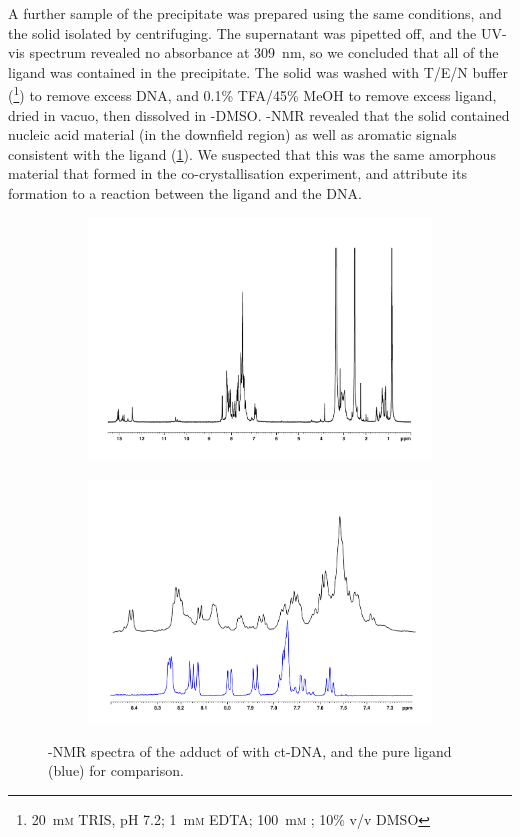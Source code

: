 \begin{refsection}
A further sample of the precipitate was prepared using the same conditions, and the solid isolated by centrifuging.
The supernatant was pipetted off, and the UV-vis spectrum revealed no absorbance at 309~nm, so we concluded that all of the ligand was contained in the precipitate.
The solid was washed with T/E/N buffer (\footnote{20~m\textsc{m} TRIS, pH 7.2; 1~m\textsc{m} EDTA; 100~m\textsc{m} ; 10\% v/v DMSO}) to remove excess DNA, and 0.1\% TFA/45\% MeOH to remove excess ligand, dried in vacuo, then dissolved in -DMSO.\@
{}-NMR revealed that the solid contained nucleic acid material (in the downfield region) as well as aromatic signals consistent with the ligand (\cref{fig:ebshoe-dna-adduct}).
We suspected that this was the same amorphous material that formed in the co-crystallisation experiment, and attribute its formation to a reaction between the ligand and the DNA.\@

\begin{figure}
    \centering
    \begin{subfigure}{\linewidth}
        \centering
        \includegraphics[width=0.8\linewidth]{Figures/ebshoe-dna-adduct-full.pdf}
        \caption{}
    \end{subfigure}
    \begin{subfigure}{\linewidth}
        \centering
        \includegraphics[width=0.8\linewidth]{Figures/ebshoe-dna-adduct-aromatic.pdf}
        \caption{}
    \end{subfigure}
    \caption{-NMR spectra of the adduct of  with ct-DNA, and the pure ligand (blue) for comparison.}\label{fig:ebshoe-dna-adduct}


\end{figure}
\end{refsection}

